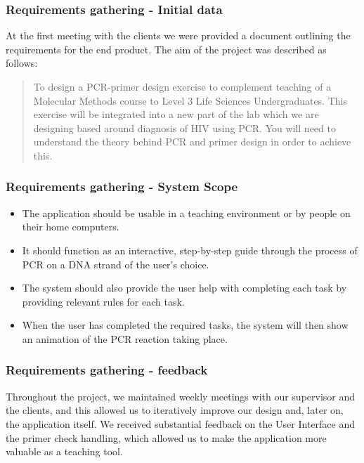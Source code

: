 \frame{\titlepage}

\begin{frame}
\frametitle{Requirements gathering - Initial data}
At the first meeting with the clients we were provided a document outlining the requirements for the end product. The aim of the project was described as follows:
\begin{quotation}
To design a PCR-primer design exercise to complement teaching of a
Molecular Methods course to Level 3 Life Sciences Undergraduates. This
exercise will be integrated into a new part of the lab which we are
designing based around diagnosis of HIV using PCR. You will need to
understand the theory behind PCR and primer design in order to achieve
this.
\end{quotation}
\end{frame}    

\begin{frame}
\frametitle{Requirements gathering - System Scope}
\begin{itemize}
\item{The application should be usable in a teaching environment or by people on their home computers.}
\item{It should function as an interactive, step-by-step guide through 
the process of PCR on a DNA strand of the user's choice.}
\item{The system should also provide the user help with completing each 
task by providing relevant rules for each task.}
\item{When the user has completed the required tasks, the system will then show an animation of the PCR reaction taking place.}
\end{itemize}
\end{frame}

\begin{frame}
\frametitle{Requirements gathering - feedback}
Throughout the project, we maintained weekly meetings with our supervisor and the clients, and this allowed us to iteratively improve our design and, later on, the application itself. We received substantial feedback on the User Interface and the primer check handling, which allowed us to make the application more valuable as a teaching tool.
\end{frame}

